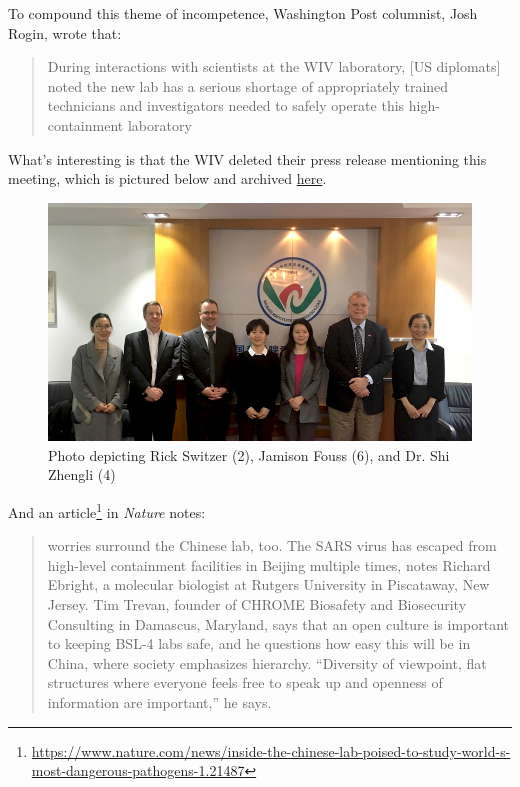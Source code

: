\documentclass[11pt]{article}
\begin{document}
To compound this theme of incompetence, Washington Post columnist, Josh Rogin, wrote that:
\begin{quote}
During interactions with scientists at the WIV laboratory, [US diplomats] noted the new lab has a serious shortage of appropriately trained technicians and investigators needed to safely operate this high-containment laboratory
\end{quote}
What's interesting is that the WIV deleted their press release mentioning this meeting, which is pictured below and archived \href{https://archive.is/6lc3C}{here}.
\begin{figure}[htbp]
\centering
\includegraphics[width=.9\linewidth]{./images/deleted-meeting.png}
\caption{Photo depicting Rick Switzer (2), Jamison Fouss (6), and Dr. Shi Zhengli (4)}
\end{figure}

And an article\footnote{\url{https://www.nature.com/news/inside-the-chinese-lab-poised-to-study-world-s-most-dangerous-pathogens-1.21487}} in \emph{Nature} notes:
\begin{quote}
worries surround the Chinese lab, too. The SARS virus has escaped from high-level containment facilities in Beijing multiple times, notes Richard Ebright, a molecular biologist at Rutgers University in Piscataway, New Jersey. Tim Trevan, founder of CHROME Biosafety and Biosecurity Consulting in Damascus, Maryland, says that an open culture is important to keeping BSL-4 labs safe, and he questions how easy this will be in China, where society emphasizes hierarchy. “Diversity of viewpoint, flat structures where everyone feels free to speak up and openness of information are important,” he says.
\end{quote}
\end{document}
